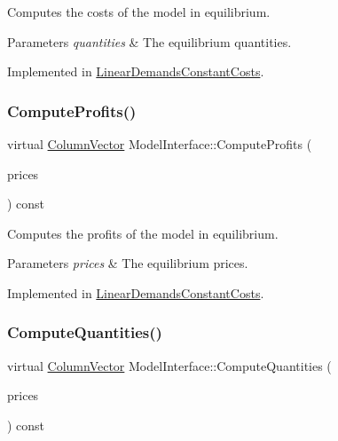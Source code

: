 Computes the costs of the model in equilibrium.


\begin{DoxyParams}{Parameters}
{\em quantities} & The equilibrium quantities. \\
\hline
\end{DoxyParams}


Implemented in \hyperlink{classLinearDemandsConstantCosts_a74f907b4737865de086c8aa1f125d7c8}{Linear\+Demands\+Constant\+Costs}.

\mbox{\label{classModelInterface_a311a000060cece8fc1058cd27bf07864}} 
\subsubsection{\texorpdfstring{Compute\+Profits()}{ComputeProfits()}}
{\footnotesize\ttfamily virtual \hyperlink{classColumnVector}{Column\+Vector} Model\+Interface\+::\+Compute\+Profits (\begin{DoxyParamCaption}\item[{\hyperlink{classColumnVector}{Column\+Vector} const \&}]{prices }\end{DoxyParamCaption}) const\hspace{0.3cm}{\ttfamily [pure virtual]}}

Computes the profits of the model in equilibrium.


\begin{DoxyParams}{Parameters}
{\em prices} & The equilibrium prices. \\
\hline
\end{DoxyParams}


Implemented in \hyperlink{classLinearDemandsConstantCosts_a48b52dab01d2cf45beae51eab615f7ae}{Linear\+Demands\+Constant\+Costs}.

\mbox{\label{classModelInterface_af9a936f6f0d1b1f0f2c5bf35785e7db4}} 
\subsubsection{\texorpdfstring{Compute\+Quantities()}{ComputeQuantities()}}
{\footnotesize\ttfamily virtual \hyperlink{classColumnVector}{Column\+Vector} Model\+Interface\+::\+Compute\+Quantities (\begin{DoxyParamCaption}\item[{\hyperlink{classColumnVector}{Column\+Vector} const \&}]{prices }\end{DoxyParamCaption}) const\hspace{0.3cm}{\ttfamily [pure virtual]}}

